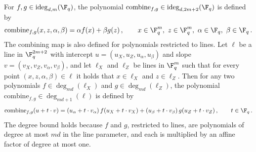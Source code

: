 \begin{definition}
	\label{def:combine-map}
	\notready
	For $f, g \in \mathrm{ideg}_{d,m}(\F_q)$, the polynomial
	$\mathrm{combine}_{f,g} \in \mathrm{ideg}_{d,2m+2}(\F_q)$ is defined by
	\[
		\mathrm{combine}_{f,g}(x, z, \alpha, \beta)
		= \alpha f(x) + \beta g(z)\,,
		\qquad x \in \F_q^m,\ z \in \F_q^m,\ \alpha \in \F_q,\
		\beta \in \F_q\,.
	\]
	The combining map is also defined for polynomials restricted to lines.
	Let $\ell$ be a line in $\F_q^{2m+2}$ with intercept
	$u = (u_X, u_Z, u_\alpha, u_\beta)$ and slope
	$v = (v_X, v_Z, v_\alpha, v_\beta)$, and let $\ell_X$ and $\ell_Z$ be
	lines in $\F_q^m$ such that for every point
	$(x, z, \alpha, \beta) \in \ell$ it holds that $x \in \ell_X$ and
	$z \in \ell_Z$. Then for any two polynomials
	$f \in \deg_{md}(\ell_X)$ and $g \in \deg_{md}(\ell_Z)$, the polynomial
	$\mathrm{combine}_{f,g} \in \deg_{md+1}(\ell)$ is defined by
	\begin{equation}
		\label{eq:combine-lines}
		\mathrm{combine}_{f,g}(u + t \cdot v)
		= (u_\alpha + t \cdot v_\alpha)\, f(u_X + t \cdot v_X)
		+ (u_\beta + t \cdot v_\beta)\, g(u_Z + t \cdot v_Z)\,,
		\qquad t \in \F_q\,.
	\end{equation}
	The degree bound holds because $f$ and $g$, restricted to lines, are
	polynomials of degree at most $md$ in the line parameter, and each is
	multiplied by an affine factor of degree at most one.
\end{definition}

